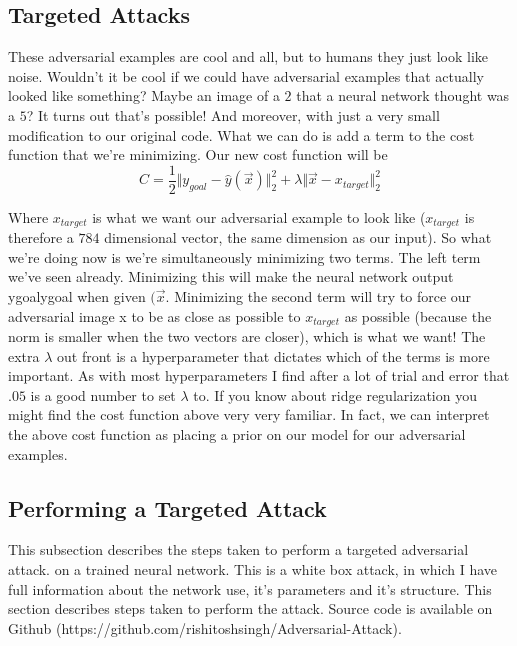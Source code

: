     \subsection{Targeted Attacks}
        These adversarial examples are cool and all, but to humans they just look like noise. Wouldn’t it be cool if we could have adversarial examples that actually looked like something? Maybe an image of a $2$ that a neural network thought was a $5$? It turns out that’s possible! And moreover, with just a very small modification to our original code. What we can do is add a term to the cost function that we’re minimizing. Our new cost function will be $$ C = \frac{1}{2} \Vert y_{goal} - \hat{y}(\overrightarrow{x}) \Vert_{2}^{2}  + \lambda \Vert  \overrightarrow{x} - x_{target}  \Vert_{2}^{2}   $$

        Where $x_{target}$ is what we want our adversarial example to look like ($x_{target}$ is therefore a $784$ dimensional vector, the same dimension as our input). So what we’re doing now is we’re simultaneously minimizing two terms. The left term we’ve seen already. Minimizing this will make the neural network output ygoalygoal when given $(\overrightarrow{x}$. Minimizing the second term will try to force our adversarial image x to be as close as possible to $x_{target}$ as possible (because the norm is smaller when the two vectors are closer), which is what we want! The extra $\lambda$ out front is a hyperparameter that dictates which of the terms is more important. As with most hyperparameters I find after a lot of trial and error that $.05$ is a good number to set $\lambda$ to. If you know about ridge regularization you might find the cost function above very very familiar. In fact, we can interpret the above cost function as placing a prior on our model for our adversarial examples.

    \subsection{Performing a Targeted Attack} \label{sec:targetedattack}
        This subsection describes the steps taken to perform a targeted adversarial attack. on a trained neural network. This is a white box attack, in which I have full information about the network use, it's parameters and it's structure. This section describes steps taken to perform the attack. Source code is available on Github (https://github.com/rishitoshsingh/Adversarial-Attack). 


